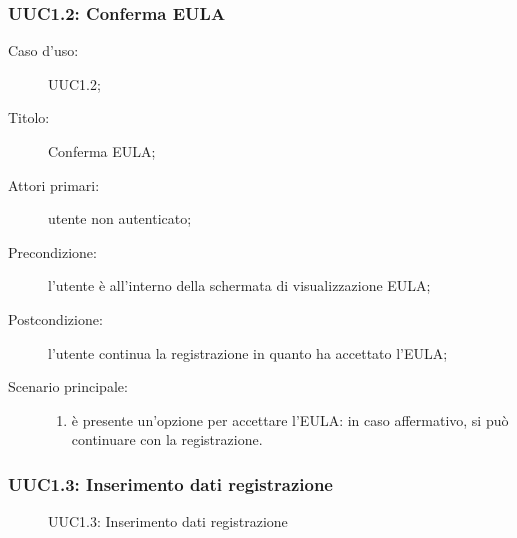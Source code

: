 \documentclass[../../../analisi-dei-requisiti.tex]{subfiles}
\begin{document}
\subsubsection{UUC1.2: Conferma EULA}%
\label{subs:UUC1.2}
\begin{description}
  \item[Caso d'uso:] UUC1.2;
  \item[Titolo:] Conferma EULA\@;
  \item[Attori primari:] utente non autenticato;
  \item[Precondizione:] l'utente è all'interno della schermata di visualizzazione EULA\@;
  \item[Postcondizione:] l'utente continua la registrazione in quanto ha accettato l'EULA\@;
  \item[Scenario principale:]
        \begin{enumerate}
          \item è presente un'opzione per accettare l'EULA\@: in caso affermativo, si può continuare con la registrazione.
        \end{enumerate}
\end{description}

\subsubsection{UUC1.3: Inserimento dati registrazione}%
\label{subs:UUC1.3}

\begin{figure}[H]
  \centering
  \caption{UUC1.3: Inserimento dati registrazione}%
  \label{fig:uuc1_3}
\end{figure}
\end{document}
